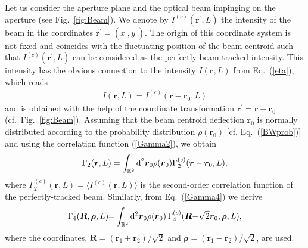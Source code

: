 \documentclass[aps,pra,twocolumn,a4paper,nofootinbib,preprintnumbers] {revtex4-1}
\newcommand{\D}{{\rm{d}}}
\begin{document}
	Let us consider the aperture plane and the optical beam impinging on the aperture (see Fig.~\ref{fig:Beam}).
	We denote by $I^{(c)}(\boldsymbol{r}^\prime,L)$  the intensity of the beam in the coordinates $\boldsymbol{r}^\prime=(x^\prime,y^\prime)$.
	The origin of this coordinate system is not fixed and coincides with the fluctuating position of the beam centroid  such that $I^{(c)}(\boldsymbol{r}^\prime,L)$ can be considered as the perfectly-beam-tracked intensity.
	This intensity has the  obvious connection to the intensity $I(\boldsymbol{r},L)$ from Eq.~(\ref{eta}), which reads 
		\begin{align}
		I(\boldsymbol{r},L)=I^{(c)}(\boldsymbol{r}-\boldsymbol{r}_0,L)
		\end{align}
	and is obtained with the help of the coordinate transformation $\boldsymbol{r}^\prime=\boldsymbol{r}-\boldsymbol{r}_0$ (cf.~Fig.~\ref{fig:Beam}).
	Assuming that the beam centroid deflection $\boldsymbol{r}_0$ is normally distributed according to the probability distribution $\rho(\boldsymbol{r}_0)$ [cf. Eq.~(\ref{BWprob})] and using the  correlation function (\ref{Gamma2}), we obtain
		\begin{align} \label{ConditGamma2}
		\Gamma_2(\boldsymbol{r},L)=\int_{\mathbb{R}^2} \D^2\boldsymbol{r}_0  \rho(\boldsymbol{r}_0)\Gamma_{2}^{(c)}(\boldsymbol{r}-\boldsymbol{r}_0,L),
		\end{align}
	where $\Gamma_2^{(c)}(\boldsymbol{r},L)=\langle I^{(c)}(\boldsymbol{r},L)\rangle$ is the second-order correlation function of the perfectly-tracked beam.
	Similarly, from Eq.~(\ref{Gamma4}) we derive
		\begin{align}\label{ConditGamma4}
		\Gamma_4(\boldsymbol{R},\boldsymbol{\rho},L){=}\int_{\mathbb{R}^2} \D^2\boldsymbol{r}_0  \rho(\boldsymbol{r}_0)\,
		\Gamma_{4}^{(c)}(\boldsymbol{R}{-}\sqrt{2}\boldsymbol{r}_0,\boldsymbol{\rho},L),
		\end{align}
	where the coordinates, $ \boldsymbol{R}{=}(\boldsymbol{r}_1{+}\boldsymbol{r}_2)/\sqrt{2}$ and $\boldsymbol{\rho}{=}(\boldsymbol{r}_1{-}\boldsymbol{r}_2)/\sqrt{2}$, are used.
\end{document}
